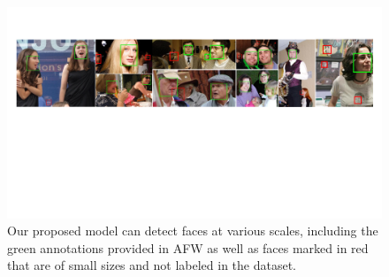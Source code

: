 \documentclass[10pt,twocolumn,letterpaper]{article}
\begin{document}
\begin{figure}[ht!]
	\begin{center}
		\includegraphics[width=.97\linewidth]{afw_gt_missed.pdf}
	\end{center}
	\vspace{-.2cm}
	\caption{Our proposed model can detect faces at various scales, including the green annotations provided in AFW \cite{Zhu2012Face} as well as faces marked in red that are of small sizes and not labeled in the dataset.}
	\label{afw_gt_missed}
\end{figure}
\end{document}
